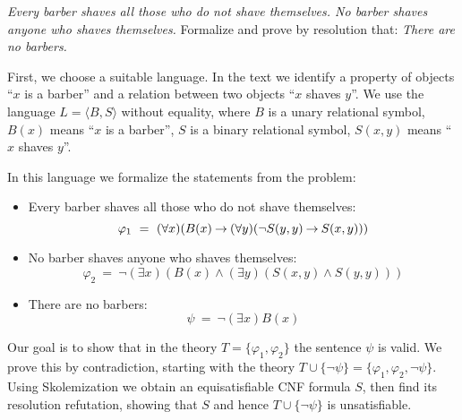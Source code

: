 \begin{problem} 
    
    \emph{Every barber shaves all those who do not shave themselves. No barber shaves anyone who shaves themselves.} Formalize and prove by resolution that: \emph{There are no barbers.}

    \begin{solution}

        First, we choose a suitable language. In the text we identify a property of objects ``$x$ is a barber'' and a relation between two objects ``$x$ shaves $y$''. We use the language $L=\langle B, S\rangle$ without equality, where $B$ is a unary relational symbol, $B(x)$ means ``$x$ is a barber'', $S$ is a binary relational symbol, $S(x,y)$ means ``$x$ shaves $y$''. 
        
        In this language we formalize the statements from the problem:
        \begin{itemize}
            \item Every barber shaves all those who do not shave themselves: 
            $$
            \varphi_1\ =\ (\forall x)(B(x)\mathbin{\rightarrow} (\forall y)(\neg S(y,y)\mathbin{\rightarrow} S(x,y)))
            $$
            \item No barber shaves anyone who shaves themselves: 
            $$
            \varphi_2\ =\ \neg (\exists x)(B(x) \land (\exists y)(S(x,y)\land S(y,y)))
            $$
            \item There are no barbers:
            $$
            \psi\ =\ \neg (\exists x)B(x)
            $$
        \end{itemize}
        Our goal is to show that in the theory $T=\{\varphi_1,\varphi_2\}$ the sentence $\psi$ is valid. We prove this by contradiction, starting with the theory $T\cup\{\neg\psi\}=\{\varphi_1,\varphi_2,\neg\psi\}$. Using Skolemization we obtain an equisatisfiable CNF formula $S$, then find its resolution refutation, showing that $S$ and hence $T\cup\{\neg\psi\}$ is unsatisfiable.


\end{solution}
\end{problem}
